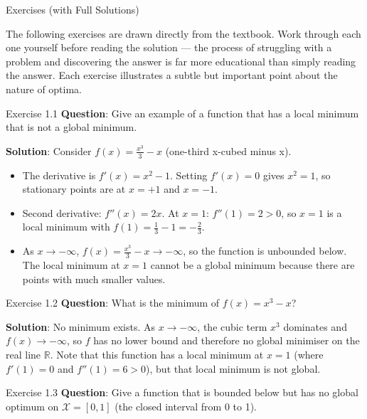 \documentclass[aspectratio=169,10pt]{beamer}
\newcommand{\R}{\mathbb{R}}
\begin{document}
\begin{frame}[allowframebreaks]{Exercises (with Full Solutions)}

The following exercises are drawn directly from the textbook.  Work through
each one yourself before reading the solution --- the process of struggling
with a problem and discovering the answer is far more educational than
simply reading the answer.  Each exercise illustrates a subtle but important
point about the nature of optima.

  \begin{block}{Exercise 1.1}
    \textbf{Question}: Give an example of a function that has a local minimum
    that is not a global minimum.

    \medskip
    \textbf{Solution}: Consider $f(x) = \tfrac{x^3}{3} - x$
    (one-third x-cubed minus x).
    \begin{itemize}
      \item The derivative is $f'(x) = x^2 - 1$.  Setting $f'(x) = 0$ gives
        $x^2 = 1$, so stationary points are at $x = +1$ and $x = -1$.
      \item Second derivative: $f''(x) = 2x$.  At $x = 1$: $f''(1) = 2 > 0$,
        so $x = 1$ is a local minimum with $f(1) = \tfrac{1}{3} - 1 = -\tfrac{2}{3}$.
      \item As $x \to -\infty$, $f(x) = \tfrac{x^3}{3} - x \to -\infty$,
        so the function is unbounded below.  The local minimum at $x = 1$
        cannot be a global minimum because there are points with much smaller values.
    \end{itemize}
  \end{block}

  \begin{block}{Exercise 1.2}
    \textbf{Question}: What is the minimum of $f(x) = x^3 - x$?

    \medskip
    \textbf{Solution}: No minimum exists.  As $x \to -\infty$,
    the cubic term $x^3$ dominates and $f(x) \to -\infty$, so $f$ has no
    lower bound and therefore no global minimiser on the real line $\R$.
    Note that this function has a local minimum at $x = 1$ (where $f'(1) = 0$
    and $f''(1) = 6 > 0$), but that local minimum is not global.
  \end{block}

  \begin{block}{Exercise 1.3}
    \textbf{Question}: Give a function that is bounded below but has no
    global optimum on $\mathcal{X} = [0, 1]$ (the closed interval from 0 to 1).


\end{block}
\end{frame}
\end{document}
